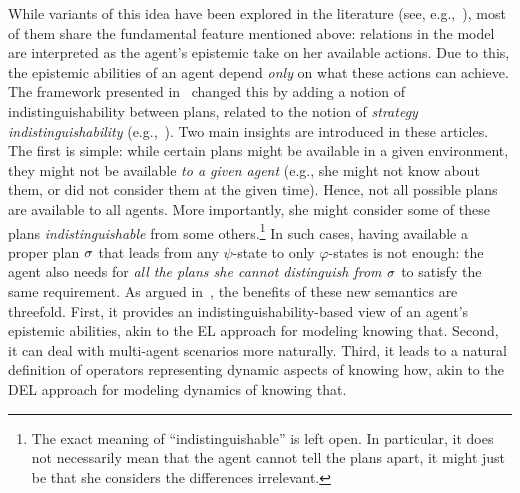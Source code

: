 While variants of this idea have been explored in the literature (see, e.g.,~\cite{Li17,LiWang17,FervariHLW17,Wang19a,LiW24}),
most of them share the fundamental feature mentioned above: relations in the model are interpreted as the agent's epistemic take on her available actions. Due to this, the epistemic abilities of an agent depend \emph{only} on what these actions can achieve. The framework presented in~\cite{AFSVQ21,AFSVQ23report} changed this by adding a notion of indistinguishability between plans, related to the notion of \emph{strategy indistinguishability} (e.g.,~\cite{JamrogaH04,Belardinelli14}). Two main insights are introduced in these articles. The first is simple: while certain plans might be available in a given environment, they might not be available \emph{to a given agent} (e.g., she might not know about them, or did not consider them at the given time). Hence, not all possible plans are available to all agents.  More importantly, she might consider some of these plans \emph{indistinguishable} from some others.\footnote{The exact meaning of ``indistinguishable'' is left open. In particular, it does not necessarily mean that the agent cannot tell the plans apart, it might just be that she considers the differences irrelevant.} In such cases, having available a proper plan $\sigma$ that leads from any $\psi$-state to only $\varphi$-states is not enough: the agent also needs for \emph{all the plans she cannot distinguish from $\sigma$} to satisfy the same requirement. 
As argued in~\cite{AFSVQ21}, the benefits of these new semantics are threefold. First, it provides an indistinguishability-based view of an agent's epistemic abilities, akin to the EL approach for modeling knowing that. Second, it can deal with multi-agent scenarios more naturally. Third, it leads to a natural definition of operators representing dynamic aspects of knowing how, akin to the DEL approach for modeling dynamics of knowing that.
%
